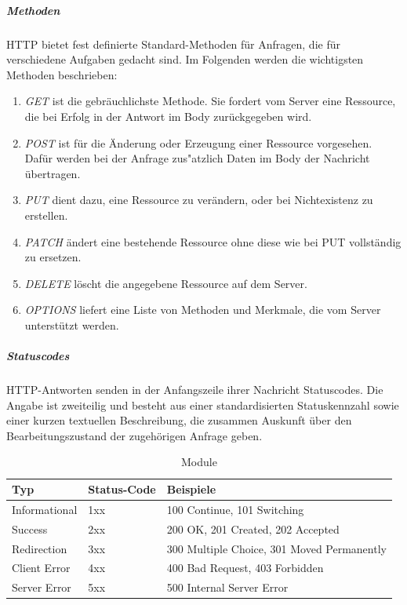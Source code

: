 \noindent
\subparagraph{Methoden}
HTTP bietet fest definierte Standard-Methoden für Anfragen, die für verschiedene Aufgaben gedacht sind. Im Folgenden werden die wichtigsten Methoden beschrieben:

\begin{enumerate}
		\item \textit{GET} ist die gebräuchlichste Methode. Sie fordert vom Server eine Ressource, die bei Erfolg in der Antwort im Body zurückgegeben wird. 
		
		\item \textit{POST} ist für die Änderung oder Erzeugung einer Ressource vorgesehen. Dafür werden bei der Anfrage zus"atzlich Daten im Body der Nachricht übertragen.
		
		\item \textit{PUT} dient dazu, eine Ressource zu verändern, oder bei Nichtexistenz zu erstellen.
	
		\item \textit{PATCH} ändert eine bestehende Ressource ohne diese wie bei PUT vollständig zu ersetzen. 
		
		\item \textit{DELETE} löscht die angegebene Ressource auf dem Server.
		
		\item \textit{OPTIONS} liefert eine Liste von Methoden und Merkmale, die vom Server unterstützt werden.
		
\end{enumerate}
\newpage
\noindent
\subparagraph{Statuscodes}
HTTP-Antworten senden in der Anfangszeile ihrer Nachricht Statuscodes. Die Angabe ist zweiteilig und besteht aus einer standardisierten Statuskennzahl sowie einer kurzen textuellen Beschreibung, die zusammen Auskunft über den Bearbeitungszustand der zugehörigen Anfrage geben.\newline

\begin{table}[tbt]
\caption{Module}
\begin{center}
    \begin{tabular}{ l  l   p{8cm} }
    \toprule
    Typ & Status-Code & Beispiele \\
    \midrule
    
    Informational & 1xx & 100 Continue, 101 Switching\\

    Success & 2xx & 200 OK, 201 Created, 202 Accepted  \\

	Redirection & 3xx & 300 Multiple Choice, 301 Moved Permanently  \\

    Client Error & 4xx & 400 Bad Request, 403 Forbidden\\ 

    Server Error & 5xx & 500 Internal Server Error \\
    \bottomrule
    \end{tabular}
\end{center}
\end{table}

